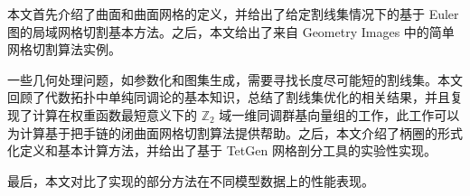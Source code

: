 本文首先介绍了曲面和曲面网格的定义，并给出了给定割线集情况下的基于 Euler 图的局域网格切割基本方法。之后，本文给出了来自 Geometry Images 中的简单网格切割算法实例。
  
一些几何处理问题，如参数化和图集生成，需要寻找长度尽可能短的割线集。本文回顾了代数拓扑中单纯同调论的基本知识，总结了割线集优化的相关结果，并且复现了计算在权重函数最短意义下的 $ \mathbb{Z}_2 $ 域一维同调群基向量组的工作，此工作可以为计算基于把手链的闭曲面网格切割算法提供帮助。之后，本文介绍了柄圈的形式化定义和基本计算方法，并给出了基于 TetGen 网格剖分工具的实验性实现。

最后，本文对比了实现的部分方法在不同模型数据上的性能表现。










